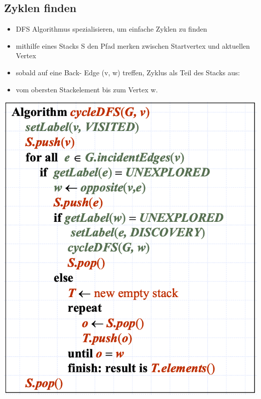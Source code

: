 \subsection{Zyklen finden}
\begin{itemize}
    \item DFS Algorithmus spezialisieren, um einfache Zyklen zu finden
    \item mithilfe eines Stacks S den Pfad merken zwischen Startvertex und aktuellen Vertex
    \item sobald auf eine Back- Edge (v, w) treffen, Zyklus als Teil des Stacks aus:
    \item vom obersten Stackelement bis zum Vertex w.
\end{itemize}
\vspace{-8pt}
\begin{center}
    \includegraphics[scale=.3]{graphic/12 DFS/Zyklen finden.png}
\end{center}
\vspace{-8pt}


\newpage